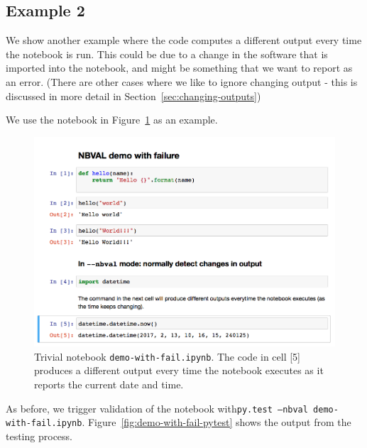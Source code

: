 \documentclass{deliverablereport}
\begin{document}
\subsection{Example 2}
We show another example where the code computes a different output
every time the notebook is run. This could be due to a change in the
software that is imported into the notebook, and might be something
that we want to report as an error. (There are other cases where we
like to ignore changing output - this is discussed in more detail in Section~\ref{sec:changing-outputs})

We use the notebook in Figure~\ref{fig:demo-with-fail-ipynb} as an
example.

\begin{figure}[ht]
  \centering
  \includegraphics[width=1\textwidth]{examples/demo-with-fail.png}
  \caption{Trivial notebook \texttt{demo-with-fail.ipynb}. The code in
    cell [5] produces a different output every time the notebook
    executes as it reports the current date and time. \label{fig:demo-with-fail-ipynb}}
\end{figure}

As before, we trigger validation of the notebook with\linebreak \texttt{py.test --nbval demo-with-fail.ipynb}. Figure~\ref{fig:demo-with-fail-pytest} shows the output
from the testing process.
\end{document}
